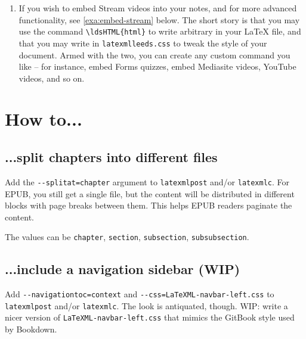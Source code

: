 \documentclass[a4paper]{article}
\def\ltxinline{\lstinline[style=latexml]}
\theoremstyle{definition}
\begin{document}
\begin{enumerate}
\begin{lstlisting}[language=bash]
# to create the EPUB
latexmlc --splitat=chapter --css=latexmlleeds.css \
  --svg --destination=myfile.epub myfile.tex
  \end{lstlisting}
  I strongly recommend you put the output in a subfolder (the \verb|mynotes| in \verb|mynotes/myfile.html| above) since there will be additional files that need to travel together with the main \verb|myfile.html|.

  The option \verb|--splitat=| can split the output in various ways (part, chapter, section\dots{}) according to your needs. You \textbf{must} split long lecture notes, otherwise MathJax will take ages to render your formulas and EPUB readers will spend a long time paginating the content.
  \item If you wish to embed Stream videos into your notes, and for more advanced functionality, see \autoref{exa:embed-stream} below. The short story is that you may use the command \ltxinline|\ldsHTML{html}| to write arbitrary \HTML{} in your \LaTeX{} file, and that you may write in \verb|latexmlleeds.css| to tweak the style of your document. Armed with the two, you can create any custom command you like -- for instance, embed Forms quizzes, embed Mediasite videos, YouTube videos, and so on.
\end{enumerate}

\section{How to...}

\subsection{...split chapters into different files}
Add the \verb|--splitat=chapter| argument to \verb|latexmlpost| and/or \verb|latexmlc|. For EPUB, you still get a single file, but the content will be distributed in different blocks with page breaks between them. This helps EPUB readers paginate the content.

The values can be \verb|chapter|, \verb|section|, \verb|subsection|, \verb|subsubsection|.

\subsection{...include a navigation sidebar (WIP)}
Add \verb|--navigationtoc=context| and \verb|--css=LaTeXML-navbar-left.css| to \verb|latexmlpost| and/or \verb|latexmlc|. The look is antiquated, though. WIP: write a nicer version of \verb|LaTeXML-navbar-left.css| that mimics the GitBook style used by Bookdown.
\end{document}
